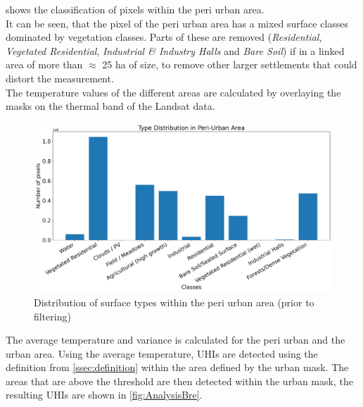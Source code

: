 \documentclass[12pt,a4paper, english,twoside]{scrartcl}
\begin{document}
       shows the classification of pixels within the peri urban area.\\
      It can be seen, that the pixel of the peri urban area has a mixed surface classes dominated by vegetation classes. 
      Parts of these are removed (\textit{Residential}, \textit{Vegetated Residential}, \textit{Industrial \& Industry Halls} and \textit{Bare Soil}) if in a linked area of more than $\approx$ 25 ha of size, to remove other larger settlements that could distort the measurement.\\
      The temperature values of the different areas are calculated by overlaying the masks on the thermal band of the Landsat data. 
        \begin{figure}[!htbp]
         \centering
         \includegraphics[width=\textwidth]{img/ClassDistributionPU2019-06-29.png}
         \caption{Distribution of surface types within the peri urban area (prior to filtering)}\label{fig:classesPeri}
        \end{figure}
        The average temperature and variance is calculated for the peri urban and the urban area.
        Using the average temperature, \glspl{UHI} are detected using the definition from \cref{ssec:definition} within the area defined by the urban mask. 
        The areas that are above the threshold are then detected within the urban mask, the resulting \glspl{UHI} are shown in \cref{fig:AnalysisBre}. 
\end{document}
